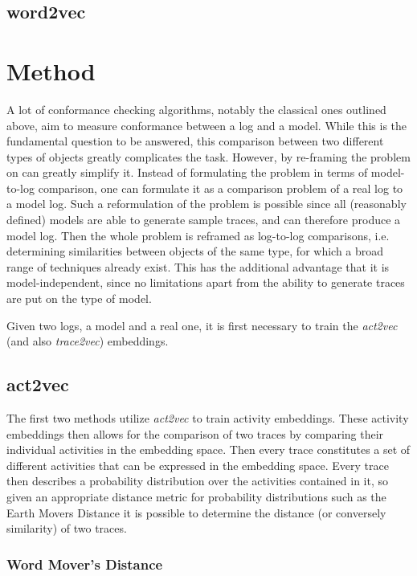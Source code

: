 \documentclass[runningheads]{template/llncs}
\begin{document}
\subsection{word2vec}

\section{Method}

A lot of conformance checking algorithms, notably the classical ones outlined above, aim to measure conformance between a log and a model.
While this is the fundamental question to be answered, this comparison between two different types of objects greatly complicates the task.
However, by re-framing the problem on can greatly simplify it.
Instead of formulating the problem in terms of model-to-log comparison, one can formulate it as a comparison problem of a real log to a model log.
Such a reformulation of the problem is possible since all (reasonably defined) models are able to generate sample traces, and can therefore produce a model log.
Then the whole problem is reframed as log-to-log comparisons, i.e. determining similarities between objects of the same type, for which a broad range of techniques already exist.
This has the additional advantage that it is model-independent, since no limitations apart from the ability to generate traces are put on the type of model.

Given two logs, a model and a real one, it is first necessary to train the \emph{act2vec}\cite{KBWe18} (and also \emph{trace2vec}) embeddings.

\subsection{act2vec}
The first two methods utilize \emph{act2vec} to train activity embeddings.
These activity embeddings then allows for the comparison of two traces by comparing their individual activities in the embedding space.
Then every trace constitutes a set of different activities that can be expressed in the embedding space.
Every trace then describes a probability distribution over the activities contained in it, so given an appropriate distance metric for probability distributions such as the Earth Movers Distance it is possible to determine the distance (or conversely similarity) of two traces.

\subsubsection{Word Mover's Distance}
\end{document}

